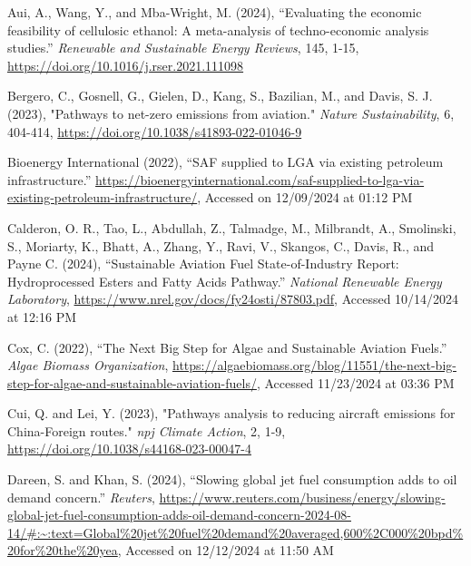 \documentclass[12pt]{article}
\begin{document}
\begin{description}
    \setlength{\itemsep}{0pt} %
    \small %

    \item Aui, A., Wang, Y., and Mba-Wright, M. (2024), “Evaluating the economic feasibility of cellulosic ethanol: A meta-analysis of techno-economic analysis studies.” \textit{Renewable and Sustainable Energy Reviews}, 145, 1-15, \url{https://doi.org/10.1016/j.rser.2021.111098}
    
    \item Bergero, C., Gosnell, G., Gielen, D., Kang, S., Bazilian, M., and Davis, S. J. (2023), "Pathways to net-zero emissions from aviation." \textit{Nature Sustainability}, 6, 404-414, \url{https://doi.org/10.1038/s41893-022-01046-9}
    
    \item Bioenergy International (2022), “SAF supplied to LGA via existing petroleum infrastructure.” \url{https://bioenergyinternational.com/saf-supplied-to-lga-via-existing-petroleum-infrastructure/}, Accessed on 12/09/2024 at 01:12 PM
    
    \item Calderon, O. R., Tao, L., Abdullah, Z., Talmadge, M., Milbrandt, A., Smolinski, S., Moriarty, K., Bhatt, A., Zhang, Y., Ravi, V., Skangos, C., Davis, R., and Payne C. (2024), “Sustainable Aviation Fuel State-of-Industry Report: Hydroprocessed Esters and Fatty Acids Pathway.” \textit{National Renewable Energy Laboratory}, \url{https://www.nrel.gov/docs/fy24osti/87803.pdf}, Accessed 10/14/2024 at 12:16 PM
    
    \item Cox, C. (2022), “The Next Big Step for Algae and Sustainable Aviation Fuels.” \textit{Algae Biomass Organization}, \url{https://algaebiomass.org/blog/11551/the-next-big-step-for-algae-and-sustainable-aviation-fuels/}, Accessed 11/23/2024 at 03:36 PM
    
    \item Cui, Q. and Lei, Y. (2023), "Pathways analysis to reducing aircraft emissions for China-Foreign routes." \textit{npj Climate Action}, 2, 1-9, \url{https://doi.org/10.1038/s44168-023-00047-4}
    
    \item Dareen, S. and Khan, S. (2024), “Slowing global jet fuel consumption adds to oil demand concern.” \textit{Reuters}, \url{https://www.reuters.com/business/energy/slowing-global-jet-fuel-consumption-adds-oil-demand-concern-2024-08-14/#:~:text=Global%20jet%20fuel%20demand%20averaged,600%2C000%20bpd%20for%20the%20yea}, Accessed on 12/12/2024 at 11:50 AM
    

\end{description}
\end{document}
